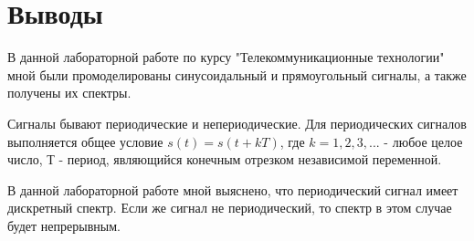 \newpage
\section{Выводы}
В данной лабораторной работе по курсу "Телекоммуникационные технологии" мной были промоделированы синусоидальный и прямоугольный сигналы, а также получены их спектры.

Сигналы бывают периодические и непериодические. Для периодических сигналов выполняется общее условие $ s(t) = s(t + kT)$, где $k = 1, 2, 3, ...$ - любое целое число, $Т$ - период, являющийся конечным отрезком независимой переменной.

В данной лабораторной работе мной выяснено, что периодический сигнал имеет дискретный спектр. Если же сигнал не периодический, то спектр в этом случае будет непрерывным.

